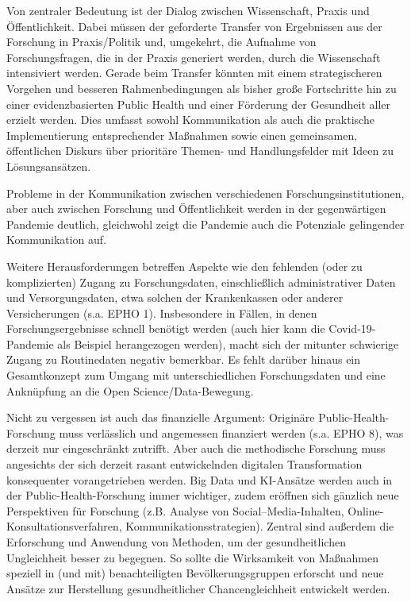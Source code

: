 \documentclass{article}
\begin{document}
Von zentraler Bedeutung ist der Dialog zwischen Wissenschaft, Praxis und Öffentlichkeit. Dabei müssen der geforderte Transfer von Ergebnissen aus der Forschung in Praxis/Politik und, umgekehrt, die Aufnahme von Forschungsfragen, die in der Praxis generiert werden, durch die Wissenschaft intensiviert werden. Gerade beim Transfer könnten mit einem strategischeren Vorgehen und besseren Rahmenbedingungen als bisher große Fortschritte hin zu einer evidenzbasierten Public Health und einer Förderung der Gesundheit aller erzielt werden. Dies umfasst sowohl Kommunikation als auch die praktische Implementierung entsprechender Maßnahmen sowie einen gemeinsamen, öffentlichen Diskurs über prioritäre Themen- und Handlungsfelder mit Ideen zu Lösungsansätzen.


Probleme in der Kommunikation zwischen verschiedenen Forschungsinstitutionen, aber auch zwischen Forschung und Öffentlichkeit werden in der gegenwärtigen Pandemie deutlich, gleichwohl zeigt die Pandemie auch die Potenziale gelingender Kommunikation auf. 


Weitere Herausforderungen betreffen Aspekte wie den fehlenden (oder zu komplizierten) Zugang zu Forschungsdaten, einschließlich administrativer Daten und Versorgungsdaten, etwa solchen der Krankenkassen oder anderer Versicherungen (s.a. EPHO 1). Insbesondere in Fällen, in denen Forschungsergebnisse schnell benötigt werden (auch hier kann die Covid-19-Pandemie als Beispiel herangezogen werden), macht sich der mitunter schwierige Zugang zu Routinedaten negativ bemerkbar. Es fehlt darüber hinaus ein Gesamtkonzept zum Umgang mit unterschiedlichen Forschungsdaten und eine Anknüpfung an die Open Science/Data-Bewegung.


Nicht zu vergessen ist auch das finanzielle Argument: Originäre Public-Health-Forschung muss verlässlich und angemessen finanziert werden (s.a. EPHO 8), was derzeit nur eingeschränkt zutrifft. Aber auch die methodische Forschung muss angesichts der sich derzeit rasant entwickelnden digitalen Transformation konsequenter vorangetrieben werden. Big Data und KI-Ansätze werden auch in der Public-Health-Forschung immer wichtiger, zudem eröffnen sich gänzlich neue Perspektiven für Forschung (z.B. Analyse von Social–Media-Inhalten, Online-Konsultationsverfahren, Kommunikationsstrategien). Zentral sind außerdem die Erforschung und Anwendung von Methoden, um der gesundheitlichen Ungleichheit besser zu begegnen. So sollte die Wirksamkeit von Maßnahmen speziell in (und mit) benachteiligten Bevölkerungsgruppen erforscht und neue Ansätze zur Herstellung gesundheitlicher Chancengleichheit entwickelt werden.
\end{document}
